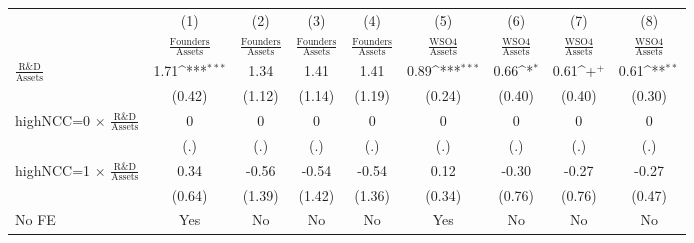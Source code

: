 {
\def\sym#1{\ifmmode^{#1}\else\(^{#1}\)\fi}
\begin{tabular}{l*{8}{c}}
\toprule
                    &\multicolumn{1}{c}{(1)}&\multicolumn{1}{c}{(2)}&\multicolumn{1}{c}{(3)}&\multicolumn{1}{c}{(4)}&\multicolumn{1}{c}{(5)}&\multicolumn{1}{c}{(6)}&\multicolumn{1}{c}{(7)}&\multicolumn{1}{c}{(8)}\\
                    &\multicolumn{1}{c}{$\frac{\textrm{Founders}}{\textrm{Assets}}$}&\multicolumn{1}{c}{$\frac{\textrm{Founders}}{\textrm{Assets}}$}&\multicolumn{1}{c}{$\frac{\textrm{Founders}}{\textrm{Assets}}$}&\multicolumn{1}{c}{$\frac{\textrm{Founders}}{\textrm{Assets}}$}&\multicolumn{1}{c}{$\frac{\textrm{WSO4}}{\textrm{Assets}}$}&\multicolumn{1}{c}{$\frac{\textrm{WSO4}}{\textrm{Assets}}$}&\multicolumn{1}{c}{$\frac{\textrm{WSO4}}{\textrm{Assets}}$}&\multicolumn{1}{c}{$\frac{\textrm{WSO4}}{\textrm{Assets}}$}\\
\midrule
$\frac{\textrm{R\&D}}{\textrm{Assets}}$&        1.71\sym{***}&        1.34         &        1.41         &        1.41         &        0.89\sym{***}&        0.66\sym{*}  &        0.61\sym{+}  &        0.61\sym{**} \\
                    &      (0.42)         &      (1.12)         &      (1.14)         &      (1.19)         &      (0.24)         &      (0.40)         &      (0.40)         &      (0.30)         \\
\addlinespace
highNCC=0 $\times$ $\frac{\textrm{R\&D}}{\textrm{Assets}}$&           0         &           0         &           0         &           0         &           0         &           0         &           0         &           0         \\
                    &         (.)         &         (.)         &         (.)         &         (.)         &         (.)         &         (.)         &         (.)         &         (.)         \\
\addlinespace
highNCC=1 $\times$ $\frac{\textrm{R\&D}}{\textrm{Assets}}$&        0.34         &       -0.56         &       -0.54         &       -0.54         &        0.12         &       -0.30         &       -0.27         &       -0.27         \\
                    &      (0.64)         &      (1.39)         &      (1.42)         &      (1.36)         &      (0.34)         &      (0.76)         &      (0.76)         &      (0.47)         \\
\addlinespace
No FE               &         Yes         &          No         &          No         &          No         &         Yes         &          No         &          No         &          No         \\

\end{tabular}}

